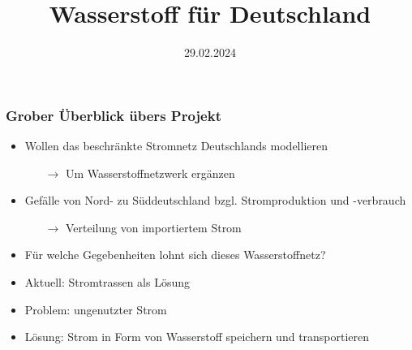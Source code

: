 \documentclass[aspectratio=169,t]{beamer}
\title{Wasserstoff für Deutschland}
\subtitle{}
\date{29.02.2024}
\author{}
\begin{document}
	
	\maketitle
	
	
	

	
	\begin{frame}
		\frametitle{Grober Überblick übers Projekt}
		\vspace*{0mm}
		\begin{itemize}
			\item Wollen das beschränkte Stromnetz Deutschlands modellieren
			\begin{itemize}
				\item [$\rightarrow$] Um Wasserstoffnetzwerk ergänzen
			\end{itemize}
		\item Gefälle von Nord- zu Süddeutschland bzgl. Stromproduktion und -verbrauch
		\begin{itemize}
			\item [$\rightarrow$] Verteilung von importiertem Strom
		\end{itemize}
		\item Für welche Gegebenheiten lohnt sich dieses Wasserstoffnetz?
		\item Aktuell: Stromtrassen als Lösung
		\item Problem: ungenutzter Strom 
		\item Lösung: Strom in Form von Wasserstoff speichern und transportieren 
		
			 
		\end{itemize}
		
			
		
	\end{frame}
			
	
\end{document}
